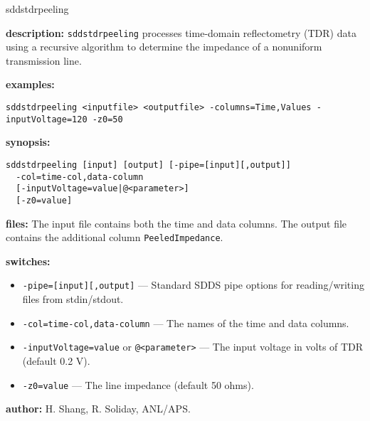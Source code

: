 \begin{sddsprog}{sddstdrpeeling}
  \item \textbf{description:} \verb|sddstdrpeeling| processes time-domain reflectometry (TDR) data using a recursive algorithm to determine the impedance of a nonuniform transmission line.
  \item \textbf{examples:}
    \begin{verbatim}
sddstdrpeeling <inputfile> <outputfile> -columns=Time,Values -inputVoltage=120 -z0=50
    \end{verbatim}
  \item \textbf{synopsis:}
    \begin{verbatim}
sddstdrpeeling [input] [output] [-pipe=[input][,output]]
  -col=time-col,data-column
  [-inputVoltage=value|@<parameter>]
  [-z0=value]
    \end{verbatim}
  \item \textbf{files:} The input file contains both the time and data columns. The output file contains the additional column \verb|PeeledImpedance|.
  \item \textbf{switches:}
    \begin{itemize}
      \item \verb|-pipe=[input][,output]| --- Standard SDDS pipe options for reading/writing files from stdin/stdout.
      \item \verb|-col=time-col,data-column| --- The names of the time and data columns.
      \item \verb|-inputVoltage=value| or \verb|@<parameter>| --- The input voltage in volts of TDR (default 0.2 V).
      \item \verb|-z0=value| --- The line impedance (default 50 ohms).
    \end{itemize}
  \item \textbf{author:} H. Shang, R. Soliday, ANL/APS.
\end{sddsprog}

